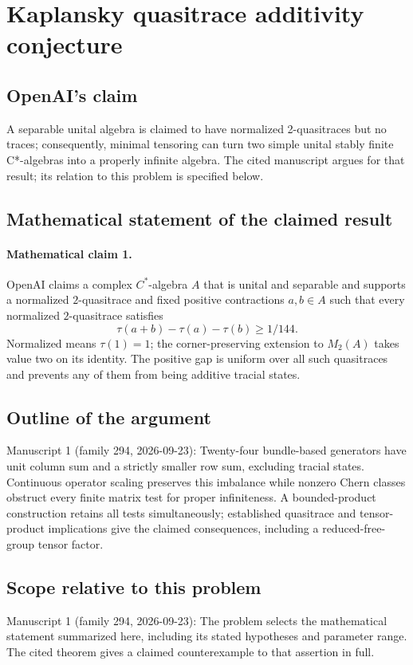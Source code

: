 \documentclass[11pt]{article}
\begin{document}
\section*{Kaplansky quasitrace additivity conjecture}

\subsection{OpenAI's claim}
A separable unital algebra is claimed to have normalized 2-quasitraces but no traces; consequently, minimal tensoring can turn two simple unital stably finite C*-algebras into a properly infinite algebra. The cited manuscript argues for that result; its relation to this problem is specified below.

\subsection{Mathematical statement of the claimed result}
\paragraph{Mathematical claim 1.} OpenAI claims a complex $C^*$-algebra $A$ that is unital and separable and supports a normalized $2$-quasitrace and fixed positive contractions $a,b\in A$ such that every normalized $2$-quasitrace satisfies
\[
\tau(a+b)-\tau(a)-\tau(b)\ge1/144.
\]
Normalized means $\tau(1)=1$; the corner-preserving extension to $M_2(A)$ takes value two on its identity. The positive gap is uniform over all such quasitraces and prevents any of them from being additive tracial states.

\subsection{Outline of the argument}
Manuscript 1 (family 294, 2026-09-23): Twenty-four bundle-based generators have unit column sum and a strictly smaller row sum, excluding tracial states. Continuous operator scaling preserves this imbalance while nonzero Chern classes obstruct every finite matrix test for proper infiniteness. A bounded-product construction retains all tests simultaneously; established quasitrace and tensor-product implications give the claimed consequences, including a reduced-free-group tensor factor.

\subsection{Scope relative to this problem}
Manuscript 1 (family 294, 2026-09-23): The problem selects the mathematical statement summarized here, including its stated hypotheses and parameter range. The cited theorem gives a claimed counterexample to that assertion in full.
\end{document}

